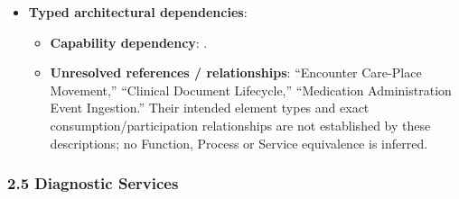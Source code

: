 \begin{itemize}
\begin{itemize}
\begin{itemize}
\item
\emph{Exposed Service}: \texttt{} — Emits canonical discharge summaries to GPs and community providers.



\end{itemize}


\end{itemize}


\item
\textbf{Typed architectural dependencies}:


\begin{itemize}

\item
\textbf{Capability dependency}: \texttt{}.



\item
\textbf{Unresolved references /\allowbreak{} relationships}: “Encounter Care-Place Movement,” “Clinical Document Lifecycle,” “Medication Administration Event Ingestion.” Their intended element types and exact consumption/\allowbreak{}participation relationships are not established by these descriptions; no Function, Process or Service equivalence is inferred.



\end{itemize}


\end{itemize}
\label{rad:sd:124}

\par\smallskip
{}\label{rad:sd:126}



\label{rad:sd:128}
\subsubsection*{2.5 Diagnostic Services}
\label{rad:sd:129}

